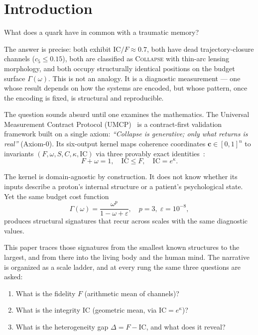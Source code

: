 \documentclass[
  aps,
  prd,
  twocolumn,
  superscriptaddress,
  nofootinbib,
  floatfix
]{revtex4-2}
\newcommand{\Gam}{\Gamma}
\newcommand{\eps}{\varepsilon}
\newcommand{\beq}{\begin{equation}}
\newcommand{\eeq}{\end{equation}}
\newcommand{\regime}[1]{\textsc{#1}}
\newcommand{\tvec}{\mathbf{c}}
\newcommand{\IC}{\mathrm{IC}}
\begin{document}
\maketitle

\section{Introduction}\label{sec:intro}

What does a quark have in common with a traumatic memory?

The answer is precise: both exhibit $\IC/F \approx 0.7$,
both have dead trajectory-closure channels ($c_5 \leq 0.15$),
both are classified as \regime{Collapse} with thin-arc
lensing morphology, and both occupy structurally identical
positions on the budget surface $\Gam(\omega)$.  This is not
an analogy.  It is a diagnostic measurement --- one whose
result depends on how the systems are encoded, but whose
pattern, once the encoding is fixed, is structural and
reproducible.

The question sounds absurd until one examines the mathematics.
The Universal Measurement Contract Protocol
(UMCP)~\cite{paulus2025umcp,paulus2025physicscoherence} is a
contract-first validation framework built on a single axiom:
\emph{``Collapse is generative; only what returns is real''}
(Axiom-0).  Its six-output kernel maps coherence coordinates
$\tvec \in [0,1]^n$ to invariants
$(F, \omega, S, C, \kappa, \IC)$ via three provably exact
identities~\cite{paulus2026umcpcasepack}:
\beq\label{eq:tier1}
  F + \omega = 1, \quad
  \IC \leq F, \quad
  \IC = e^{\kappa}.
\eeq

The kernel is domain-agnostic by construction.  It does not know
whether its inputs describe a proton's internal structure or a
patient's psychological state.  Yet the same budget cost function
\beq\label{eq:gamma}
  \Gam(\omega) = \frac{\omega^p}{1 - \omega + \eps},
  \quad p = 3,\;\eps = 10^{-8},
\eeq
produces structural signatures that recur across scales with
the same diagnostic values.

This paper traces those signatures from the smallest known
structures to the largest, and from there into the living body
and the human mind.  The narrative is organized as a scale ladder,
and at every rung the same three questions are asked:
\begin{enumerate}
\item What is the fidelity $F$ (arithmetic mean of channels)?
\item What is the integrity $\IC$ (geometric mean, via
  $\IC = e^{\kappa}$)?
\item What is the heterogeneity gap $\Delta = F - \IC$, and
  what does it reveal?
\end{enumerate}
\end{document}
